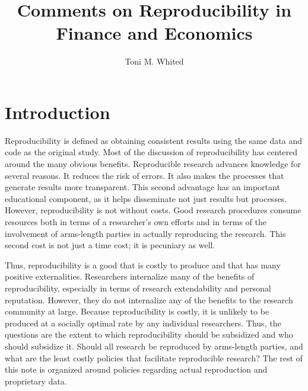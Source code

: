 \documentclass[12pt, oneside]{article}
\begin{document}
 

\title{Comments on Reproducibility in Finance and Economics}


\author{\small \color{black}Toni M. Whited}



\maketitle
\thispagestyle{empty}

\doublespacing

\section{Introduction} 
Reproducibility is defined as obtaining consistent results using the same data and code as the original study. Most of the discussion of reproducibility has centered around the many obvious benefits. Reproducible research advances knowledge for several reasons. It reduces the risk of errors.  It also makes the processes that generate results more transparent.  This second advantage has an important educational component, as it helps disseminate not just results but processes.  However, reproducibility is not without costs. Good research procedures consume resources both in terms of a researcher's own efforts and in terms of the involvement of arms-length parties in actually reproducing the research.  This second cost is not just a time cost; it is pecuniary as well. 

Thus, reproducibility is a good that is costly to produce and that has many positive externalities.  Researchers internalize many of the benefits of reproducibility, especially in terms of research extendability and personal reputation. However, they do not internalize any of the benefits to the research community at large.  Because reproducibility is costly, it is unlikely to be produced at a socially optimal rate by any individual researchers. Thus, the questions are the extent to which reproducibility should be subsidized and who should subsidize it. Should all research be reproduced by arms-length parties, and %
what are the least costly policies that facilitate reproducible research?  The rest of this note is organized around policies regarding actual reproduction and proprietary data. 
\end{document}
